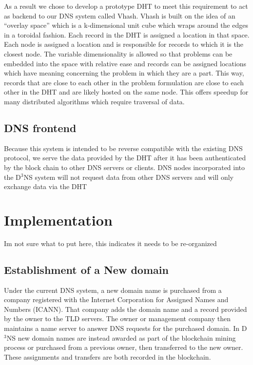 \documentclass[11pt]{IEEEtran} %
\begin{document}
As a result we chose to develop a prototype DHT to meet this requirement to act as backend to our DNS system called Vhash. Vhash is built on the idea of an “overlay space” which is a k-dimensional unit cube which wraps around the edges in a toroidal fashion. Each record in the DHT is assigned a location in that space. Each node is assigned a location and is responsible for records to which it is the closest node. The variable dimensionality is allowed so that problems can be embedded into the space with relative ease and records can be assigned locations which have meaning concerning the problem in which they are a part. This way, records that are close to each other in the problem formulation are close to each other in the DHT and are likely hosted on the same node. This offers speedup for many distributed algorithms which require traversal of data.



\subsection{DNS frontend}
Because this system is intended to be reverse compatible with the existing DNS protocol, we serve the data provided by the DHT after it has been authenticated by the block chain to other DNS servers or clients. DNS nodes incorporated into the D$^3$NS system will not request data from other DNS servers and will only exchange data via the DHT 

\section{Implementation}
Im not sure what to put here, this indicates it needs to be re-organized
\subsection{Establishment of a New domain}
Under the current DNS system, a new domain name is purchased from a company registered with the Internet Corporation for Assigned Names and Numbers (ICANN). That company adds the domain name and a record provided by the owner to the TLD servers. The owner or management company then maintains a name server to answer DNS requests for the purchased domain. In D$^{3}$NS new domain names are instead awarded as part of the blockchain mining process or purchased from a previous owner, then transferred to the new owner. These assignments and transfers are both recorded in the blockchain. 
\end{document}
